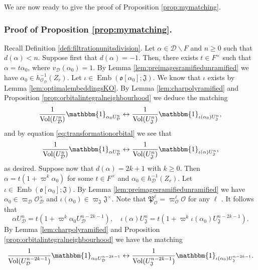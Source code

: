 \documentclass{article}
\theoremstyle{named}
\newcommand{\D}{\mathcal{D}}
\newcommand{\J}{\mathfrak{J}}
\renewcommand{\O}{\mathcal{O}}
\renewcommand{\o}{\mathfrak{o}}
\renewcommand{\P}{\mathfrak{P}}
\DeclareMathOperator{\vol}{Vol}
\DeclareMathOperator{\Emb}{Emb}
\begin{document}
We are now ready to give the proof of Proposition \ref{prop:mymatching}.

\subsubsection{Proof of Proposition \ref{prop:mymatching}.}\label{subsubsec:finishingtheproofoflocalmatching}
Recall Definition \ref{defi:filtrationunitsdivision}. Let $\alpha \in \D \smallsetminus F$ and $n \geq 0$ such that $d(\alpha)< n$. Suppose first that $d(\alpha) = -1$. Then, there exists $t \in F^\times$ such that $\alpha = t \alpha_0$, where $v_\D(\alpha_0) = 1$. By Lemma \ref{lem:preimagesramifiedunramified} we have $\alpha_0 \in h_{\O_\D}^{-1}(Z_r)$. Let $\iota \in \Emb(\o[\alpha_0]; \J)$. We know that $\iota$ exists by Lemma \ref{lem:optimalembeddingsKO}. By Lemma \ref{lem:charpolyramified} and Proposition \ref{prop:orbitalintegralneighbourhood} we deduce the matching
\begin{equation*}
\frac{1}{\vol(U_\D^n)}\mathbbm{1}_{\alpha_0 U_\D^n} \leftrightarrow \frac{1}{\vol(U_\J^n)}\mathbbm{1}_{\iota(\alpha_0) U_\J^n},
\end{equation*}
and by equation \eqref{eq:transformationorbital} we see that 
\begin{equation*}
    \frac{1}{\vol(U_\D^n)}\mathbbm{1}_{\alpha U_\D^n} \leftrightarrow \frac{1}{\vol(U_\J^n)}\mathbbm{1}_{\iota(\alpha) U_\J^n},
\end{equation*}
as desired. Suppose now that $d(\alpha) = 2k + 1$ with $k \geq 0$. Then $\alpha = t(1 + \varpi^k \alpha_0)$ for some $t \in F^\times$ and $\alpha_0 \in h_\D^{-1}(Z_r)$. Let $\iota \in \Emb(\o[\alpha_0]; \J)$.
By Lemma \ref{lem:preimagesramifiedunramified} we have $\alpha_0 \in \varpi_\D \O_\D^\times$ and $\iota(\alpha_0) \in \varpi_\J \J^\times$. Note that $\P_\O^\ell = \varpi_\O^{\ell}\O$ for any $\ell$ . 
It follows that 
\begin{equation}\label{eq:transformationsetramified}
    \alpha U_\D^n = t(1 + \varpi^k \alpha_0 U_\D^{n-2k-1}), \quad \iota(\alpha)U_\J^n = t(1 + \varpi^k \iota(\alpha_0)U_\J^{n-2k-1}).
\end{equation}
By Lemma \ref{lem:charpolyramified} and Proposition \ref{prop:orbitalintegralneighbourhood} we have the matching
\begin{equation*}
\frac{1}{\vol(U_\D^{n-2k-1})}\mathbbm{1}_{\alpha_0 U_\D^{n-2k-1}} \leftrightarrow \frac{1}{\vol(U_\J^{n-2k-1})}\mathbbm{1}_{\iota(\alpha_0) U_\J^{n-2k-1}}.
\end{equation*}
\end{document}
